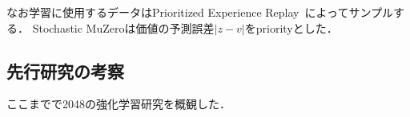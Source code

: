 なお学習に使用するデータはPrioritized Experience Replay~\cite{prioritized}によってサンプルする．
Stochastic MuZeroは価値の予測誤差$|z-v|$をpriorityとした．

\subsection{先行研究の考察}
ここまでで2048の強化学習研究を概観した．
